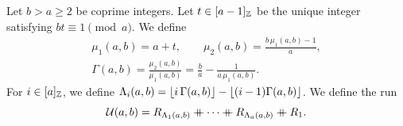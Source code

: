 \begin{definition}\label{def:frame}
Let $b>a\ge2$ be coprime integers.
Let $t\in[a-1]_{\mathbb Z}$ be the unique integer satisfying $bt\equiv1\pmod a$.
We define
\begin{equation}\label{eq:ambient}
\begin{gathered}
 \mu_1(a,b)=a+t,\qquad \mu_2(a,b)=\frac{b\,\mu_1(a,b)-1}{a},\\
 \Gamma(a,b)=\frac{\mu_2(a,b)}{\mu_1(a,b)}=\frac ba-\frac1{a\,\mu_1(a,b)}.
\end{gathered}
\end{equation}
For $i\in[a]_{\mathbb Z}$, we define $\Lambda_i(a,b)=\left\lfloor i\,\Gamma(a,b)\right\rfloor-\left\lfloor(i-1)\Gamma(a,b)\right\rfloor$.
We define the run
\begin{equation}\label{eq:frame-word}
 \mathcal{U}(a,b)=R_{\Lambda_1(a,b)}\mathbin{+\mkern-10mu+} \cdots\mathbin{+\mkern-10mu+} R_{\Lambda_a(a,b)}\mathbin{+\mkern-10mu+} R_1.
\end{equation}
\end{definition}

